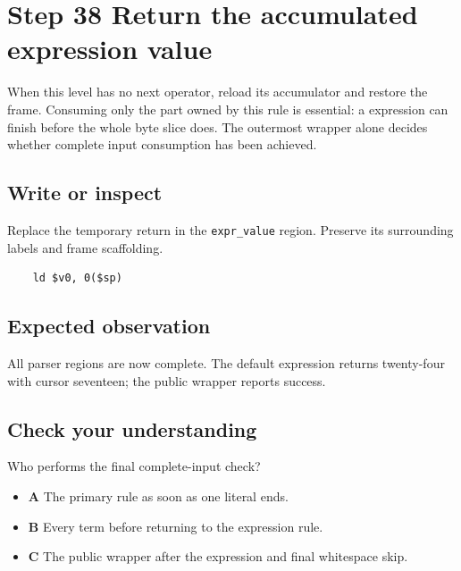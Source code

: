 \section{Step 38 Return the accumulated expression value}\label{expression-s38}

When this level has no next operator, reload its accumulator and restore the frame. Consuming only the part owned by this rule is essential: a expression can finish before the whole byte slice does. The outermost wrapper alone decides whether complete input consumption has been achieved.

\subsection{Write or inspect}
Replace the temporary return in the \texttt{expr\_value} region. Preserve its surrounding labels and frame scaffolding.

\begin{verbatim}
    ld $v0, 0($sp)
\end{verbatim}
\subsection{Expected observation}
All parser regions are now complete. The default expression returns twenty-four with cursor seventeen; the public wrapper reports success.

\subsection{Check your understanding}
Who performs the final complete-input check?

\begin{itemize}
  \item \textbf{A} The primary rule as soon as one literal ends.
  \item \textbf{B} Every term before returning to the expression rule.
  \item \textbf{C} The public wrapper after the expression and final whitespace skip.
\end{itemize}
